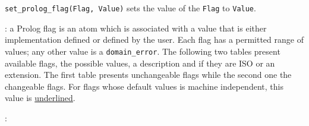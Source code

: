 \Description

\texttt{set\_prolog\_flag(Flag, Value)} sets the value
of the  \texttt{Flag} to \texttt{Value}.

: a Prolog flag is an atom
which is associated with a value that is either implementation defined
or defined by the user. Each flag has a permitted range of values; any
other value is a \texttt{domain\_error}. The following two tables
present available flags, the possible values, a description and if
they are ISO or an extension. The first table presents unchangeable
flags while the second one the changeable flags. For flags whose
default values is machine independent, this value is
\underline{underlined}.

:

